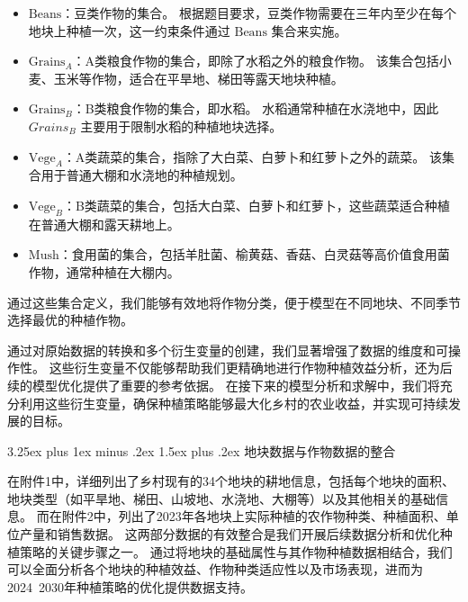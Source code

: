 \documentclass[12pt,a4paper]{nmmcm}
\makeatletter
\renewcommand\subsection{\@startsection{subsection}{2}{0pt}%
    {3.25ex plus 1ex minus .2ex}%
    {1.5ex plus .2ex}%
    {\normalfont\Large\bfseries}}
\makeatother
\begin{document}
\begin{itemize}
  \item $\text{Beans}$：豆类作物的集合。
        根据题目要求，豆类作物需要在三年内至少在每个地块上种植一次，这一约束条件通过 $\text{Beans}$ 集合来实施。

  \item $\text{Grains}_A$：A类粮食作物的集合，即除了水稻之外的粮食作物。
        该集合包括小麦、玉米等作物，适合在平旱地、梯田等露天地块种植。

  \item $\text{Grains}_B$：B类粮食作物的集合，即水稻。
        水稻通常种植在水浇地中，因此 $Grains_B$ 主要用于限制水稻的种植地块选择。

  \item $\text{Vege}_A$：A类蔬菜的集合，指除了大白菜、白萝卜和红萝卜之外的蔬菜。
        该集合用于普通大棚和水浇地的种植规划。

  \item $\text{Vege}_B$：B类蔬菜的集合，包括大白菜、白萝卜和红萝卜，这些蔬菜适合种植在普通大棚和露天耕地上。

  \item $\text{Mush}$：食用菌的集合，包括羊肚菌、榆黄菇、香菇、白灵菇等高价值食用菌作物，通常种植在大棚内。

\end{itemize}

通过这些集合定义，我们能够有效地将作物分类，便于模型在不同地块、不同季节选择最优的种植作物。


通过对原始数据的转换和多个衍生变量的创建，我们显著增强了数据的维度和可操作性。
这些衍生变量不仅能够帮助我们更精确地进行作物种植效益分析，还为后续的模型优化提供了重要的参考依据。
在接下来的模型分析和求解中，我们将充分利用这些衍生变量，确保种植策略能够最大化乡村的农业收益，并实现可持续发展的目标。


\subsection{地块数据与作物数据的整合}

在附件1中，详细列出了乡村现有的34个地块的耕地信息，包括每个地块的面积、地块类型（如平旱地、梯田、山坡地、水浇地、大棚等）以及其他相关的基础信息。
而在附件2中，列出了2023年各地块上实际种植的农作物种类、种植面积、单位产量和销售数据。
这两部分数据的有效整合是我们开展后续数据分析和优化种植策略的关键步骤之一。
通过将地块的基础属性与其作物种植数据相结合，我们可以全面分析各个地块的种植效益、作物种类适应性以及市场表现，进而为2024~2030年种植策略的优化提供数据支持。
\end{document}
